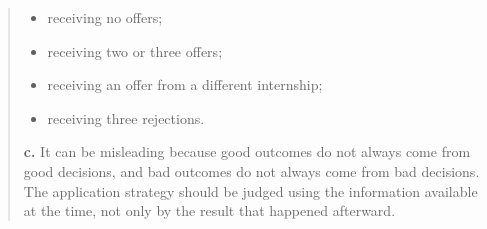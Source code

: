 \documentclass[
  letterpaper,
  DIV=11,
  numbers=noendperiod]{scrreprt}
\providecommand{\tightlist}{%
  \setlength{\itemsep}{0pt}\setlength{\parskip}{0pt}}
\begin{document}
\begin{tcolorbox}
\begin{quote}
\begin{itemize}
\tightlist
\item
  receiving no offers;
\item
  receiving two or three offers;
\item
  receiving an offer from a different internship;
\item
  receiving three rejections.
\end{itemize}

\textbf{c.} It can be misleading because good outcomes do not always
come from good decisions, and bad outcomes do not always come from bad
decisions. The application strategy should be judged using the
information available at the time, not only by the result that happened
afterward.
\end{quote}

\end{tcolorbox}
\end{document}
